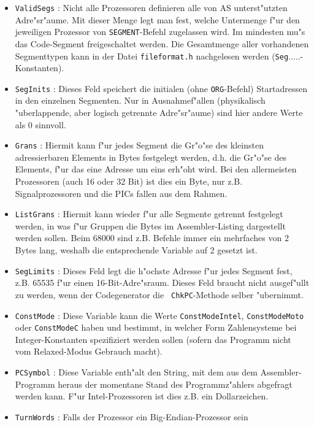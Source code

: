 \documentclass[12pt,a4paper,twoside]{report}
\newcommand{\tty}[1]{{\tt #1}}
\newcommand{\asname}{AS}
\begin{document}
\begin{itemize}
\item{\tty{ValidSegs} : Nicht alle Prozessoren definieren alle von \asname{}
      unterst"utzten Adre"sr"aume.  Mit dieser Menge legt man fest,
      welche Untermenge f"ur den jeweiligen Prozessor von \tty{SEGMENT}-Befehl
      zugelassen wird.  Im mindesten mu"s das Code-Segment freigeschaltet
      werden.  Die Gesamtmenge aller vorhandenen Segmenttypen kann in der
      Datei \tty{fileformat.h} nachgelesen werden (\tty{Seg}.....-Konstanten).}
\item{\tty{SegInits} : Dieses Feld speichert die initialen (ohne \tty{ORG}-Befehl)
      Startadressen in den einzelnen Segmenten.  Nur in Ausnahmef"allen
      (physikalisch "uberlappende, aber logisch getrennte Adre"sr"aume)
      sind hier andere Werte als 0 sinnvoll.}
\item{\tty{Grans} : Hiermit kann f"ur jedes Segment die Gr"o"se des kleinsten
      adressierbaren Elements in Bytes festgelegt werden, d.h. die
      Gr"o"se des Elements, f"ur das eine Adresse um eins erh"oht wird.
      Bei den allermeisten Prozessoren (auch 16 oder 32 Bit) ist dies
      ein Byte, nur z.B. Signalprozessoren und die PICs fallen aus dem
      Rahmen.}
\item{\tty{ListGrans} : Hiermit kann wieder f"ur alle Segmente getrennt
      festgelegt werden, in was f"ur Gruppen die Bytes im Assembler-Listing
      dargestellt werden sollen.  Beim 68000 sind z.B. Befehle immer
      ein mehrfaches von 2 Bytes lang, weshalb die entsprechende Variable
      auf 2 gesetzt ist.}
\item{\tty{SegLimits} : Dieses Feld legt die h"ochste Adresse f"ur jedes
      Segment fest, z.B. 65535 f"ur einen 16-Bit-Adre"sraum.  Dieses Feld
      braucht nicht ausgef"ullt zu werden, wenn der Codegenerator die {\tt
      ChkPC}-Methode selber "ubernimmt.}
\item{\tty{ConstMode} : Diese Variable kann die Werte \tty{ConstModeIntel},
      \tty{ConstModeMoto} oder \tty{ConstModeC} haben und bestimmt, in
      welcher Form Zahlensysteme bei Integer-Konstanten spezifiziert werden
      sollen (sofern das Programm nicht vom Relaxed-Modus Gebrauch macht).}
\item{\tty{PCSymbol} : Diese Variable enth"alt den String, mit dem aus dem
      Assembler-Programm heraus der momentane Stand des Programmz"ahlers
      abgefragt werden kann.  F"ur Intel-Prozessoren ist dies z.B. ein
      Dollarzeichen.}
\item{\tty{TurnWords} : Falls der Prozessor ein Big-Endian-Prozessor sein
}
\end{itemize}
\end{document}
